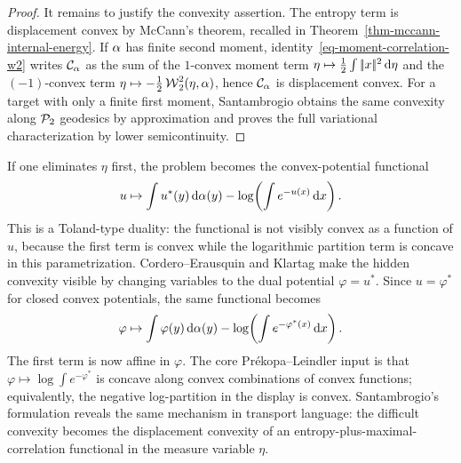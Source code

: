 \begin{proof}
	It remains to justify the convexity assertion. The entropy term is displacement convex by McCann's theorem, recalled in Theorem~\ref{thm-mccann-internal-energy}. If $\alpha$ has finite second moment, identity~\eqref{eq-moment-correlation-w2} writes $\mathcal C_\alpha$ as the sum of the $1$-convex moment term $\eta\mapsto\frac12\int|\!| x |\!|^2\,\mathrm{d}\eta$ and the $(-1)$-convex term $\eta\mapsto-\frac12\operatorname{\mathcal{W}}_2^2(\eta,\alpha)$, hence $\mathcal C_\alpha$ is displacement convex. For a target with only a finite first moment, Santambrogio obtains the same convexity along $\mathcal{P}_2$ geodesics by approximation and proves the full variational characterization by lower semicontinuity.
\end{proof}

\begin{rem}\label{rem-moment-hidden-convexity}
	If one eliminates $\eta$ first, the problem becomes the convex-potential functional
	\[
		u\mapsto
		\int u^*(y)\,\mathrm{d}\alpha(y)
		-
		\log\!\left(\int e^{-u(x)}\,\mathrm{d} x\right).
	\]
	This is a Toland-type duality: the functional is not visibly convex as a function of $u$, because the first term is convex while the logarithmic partition term is concave in this parametrization. Cordero--Erausquin and Klartag make the hidden convexity visible by changing variables to the dual potential $\varphi=u^*$. Since $u=\varphi^*$ for closed convex potentials, the same functional becomes
	\[
		\varphi\mapsto
		\int \varphi(y)\,\mathrm{d}\alpha(y)
		-
		\log\!\left(\int e^{-\varphi^*(x)}\,\mathrm{d} x\right).
	\]
	The first term is now affine in $\varphi$. The core Pr\'ekopa--Leindler input is that
	$\varphi\mapsto \log\int e^{-\varphi^*}$ is concave along convex combinations of convex functions; equivalently, the negative log-partition in the display is convex. Santambrogio's formulation reveals the same mechanism in transport language: the difficult convexity becomes the displacement convexity of an entropy-plus-maximal-correlation functional in the measure variable $\eta$.
\end{rem}

